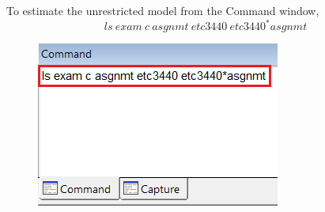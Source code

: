 \documentclass[12pt]{report}
\begin{document}
\noindent To estimate the unrestricted model from the Command window,
$$ls\ exam\ c\ asgnmt\ etc3440\ etc3440^*asgnmt$$
\begin{figure}[H]
	\centering
	\includegraphics{q1_24}
\end{figure}
\vspace{-\baselineskip}
\end{document}
